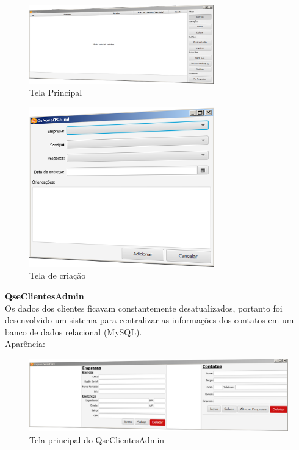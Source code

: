 \documentclass[12pt,a4paper,oneside,sumario=tradicional,brazil]{abntex2}
\begin{document}
	\begin{minipage}{\linewidth}
	\centering
	\begin{minipage}{0.45\linewidth}
		\begin{figure}[H]
			\includegraphics[width=8cm]{imgs/QseOS-principal.PNG}
			\caption{Tela Principal}
		\end{figure}
	\end{minipage}
	\hspace{0.05\linewidth}
	\begin{minipage}{0.45\linewidth}
		\begin{figure}[H]
			\includegraphics[width=8cm]{imgs/QseOS-criaros.PNG}
			\caption{Tela de criação}
		\end{figure}
	\end{minipage}
\end{minipage}

\textbf{QseClientesAdmin} \\
\indent
Os dados dos clientes ficavam constantemente desatualizados, portanto foi desenvolvido um sistema para centralizar as informações dos contatos em um banco de dados relacional (MySQL). \\
\indent
Aparência: \\
\begin{figure}[H]
	\includegraphics[width=1\linewidth]{imgs/QseClientesAdmin-telaprincipal.PNG}
	\caption{Tela principal do QseClientesAdmin}
\end{figure}
\end{document}
